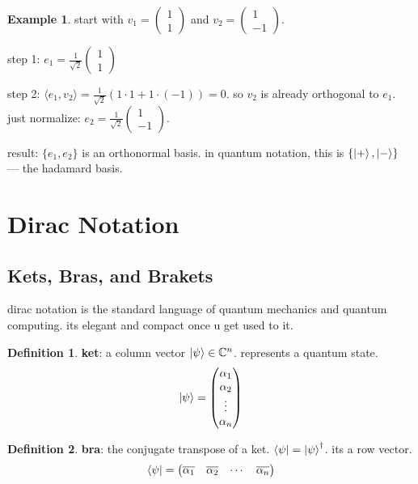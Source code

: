 \documentclass[11pt,a4paper]{article}
\theoremstyle{definition}
\newtheorem{definition}{Definition}[section]
\newtheorem{example}{Example}[section]
\theoremstyle{remark}
\begin{document}
\begin{example}
start with $v_1 = \begin{pmatrix} 1 \\ 1 \end{pmatrix}$ and $v_2 = \begin{pmatrix} 1 \\ -1 \end{pmatrix}$.

step 1: $e_1 = \frac{1}{\sqrt{2}} \begin{pmatrix} 1 \\ 1 \end{pmatrix}$

step 2: $\langle e_1, v_2 \rangle = \frac{1}{\sqrt{2}}(1 \cdot 1 + 1 \cdot (-1)) = 0$. so $v_2$ is already orthogonal to $e_1$. just normalize: $e_2 = \frac{1}{\sqrt{2}} \begin{pmatrix} 1 \\ -1 \end{pmatrix}$.

result: $\{e_1, e_2\}$ is an orthonormal basis. in quantum notation, this is $\{\ket{+}, \ket{-}\}$ --- the hadamard basis.
\end{example}

\section{Dirac Notation}

\subsection{Kets, Bras, and Brakets}

dirac notation is the standard language of quantum mechanics and quantum computing. its elegant and compact once u get used to it.

\begin{definition}
\textbf{ket}: a column vector $\ket{\psi} \in \mathbb{C}^n$. represents a quantum state.
\[
\ket{\psi} = \begin{pmatrix} \alpha_1 \\ \alpha_2 \\ \vdots \\ \alpha_n \end{pmatrix}
\]
\end{definition}

\begin{definition}
\textbf{bra}: the conjugate transpose of a ket. $\bra{\psi} = \ket{\psi}^\dagger$. its a row vector.
\[
\bra{\psi} = \begin{pmatrix} \overline{\alpha_1} & \overline{\alpha_2} & \cdots & \overline{\alpha_n} \end{pmatrix}
\]
\end{definition}
\end{document}
